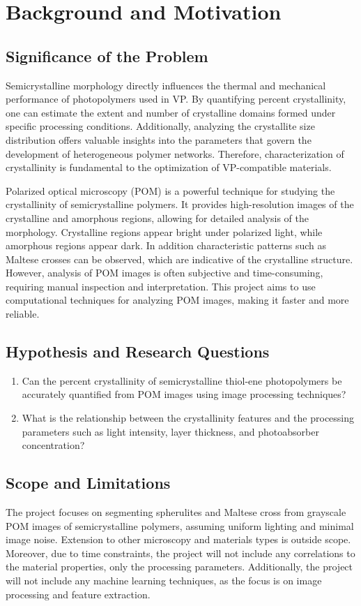 \documentclass[12pt]{article}
\begin{document}
\section{Background and Motivation}

\subsection{Significance of the Problem}
Semicrystalline morphology directly influences the thermal and mechanical performance of photopolymers used in VP. 
By quantifying percent crystallinity, one can estimate the extent and number of crystalline domains formed under specific processing conditions. 
Additionally, analyzing the crystallite size distribution offers valuable insights into the parameters that govern the development of heterogeneous polymer networks. 
Therefore, characterization of crystallinity is fundamental to the optimization of VP-compatible materials.

Polarized optical microscopy (POM) is a powerful technique for studying the crystallinity of semicrystalline polymers.
It provides high-resolution images of the crystalline and amorphous regions, allowing for detailed analysis of the morphology.
Crystalline regions appear bright under polarized light, while amorphous regions appear dark. In addition characteristic patterns such as Maltese crosses can be observed,
which are indicative of the crystalline structure.
However, analysis of POM images is often subjective and time-consuming, requiring manual inspection and interpretation.
This project aims to use computational techniques for analyzing POM images, making it faster and more reliable.

\subsection{Hypothesis and Research Questions}
\begin{enumerate}[noitemsep]
    \item Can the percent crystallinity of semicrystalline thiol-ene photopolymers be accurately quantified from POM images using image processing techniques?
    \item What is the relationship between the crystallinity features and the processing parameters such as light intensity, layer thickness, and photoabsorber concentration?
\end{enumerate}

\subsection{Scope and Limitations}
The project focuses on segmenting spherulites and Maltese cross from grayscale POM images of semicrystalline polymers, 
assuming uniform lighting and minimal image noise. Extension to other microscopy and materials types is outside scope.
Moreover, due to time constraints, the project will not include any correlations to the material properties, only the processing parameters.
Additionally, the project will not include any machine learning techniques, as the focus is on image processing and feature extraction. 
\end{document}
